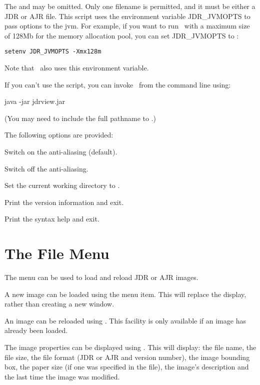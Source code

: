 The  and  may be omitted.
Only one filename is permitted, and it must be either a
\gls{JDR} or \gls{AJR} file. This script uses the environment
variable \gls{JDR_JVMOPTS} to pass options to the \gls{jvm}.
For example, if you want to run \JDRView\ with a maximum size
of 128Mb for the memory allocation pool, you can set
\gls{JDR_JVMOPTS} to :
\begin{verbatim}
setenv JDR_JVMOPTS -Xmx128m
\end{verbatim}
Note that \FlowframTk\ also uses this environment variable.

If you can't use the  script, you can invoke
\JDRView\ from the command line using:
\begin{terminal}
java -jar jdrview.jar  
\end{terminal}
(You may need to include the full pathname to .)

The following options are provided:

Switch on the anti-aliasing (default).

Switch off the anti-aliasing.

Set the current working directory to .

Print the version information and exit.

Print the syntax help and exit.

\chapter{The File Menu}\label{sec:thefilemenu}


The  menu can be used to load and reload \gls{JDR}
or \gls{AJR} images.


A new image can be loaded using the  menu item.
This will replace the display, rather than creating a new window.


An image can be reloaded using . This
facility is only available if an image has already been loaded.


The image properties can be displayed using
. This will display: the file name,
the file size, the file format (\gls{JDR} or \gls{AJR} and version number), the
image bounding box, the paper size (if one was specified in the
file), the image's description and the last time the image was
modified.

